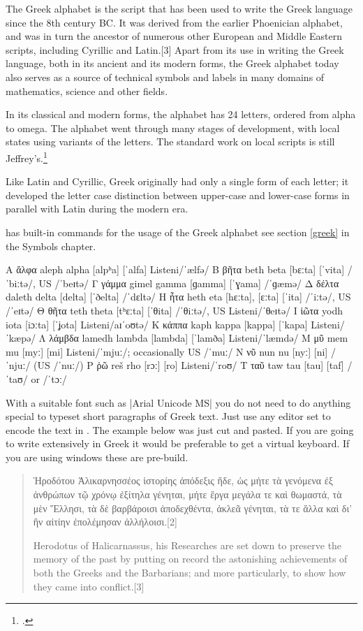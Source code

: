The Greek alphabet is the script that has been used to write the Greek language since the 8th century BC. It was derived from the earlier Phoenician alphabet, and was in turn the ancestor of numerous other European and Middle Eastern scripts, including Cyrillic and Latin.[3] Apart from its use in writing the Greek language, both in its ancient and its modern forms, the Greek alphabet today also serves as a source of technical symbols and labels in many domains of mathematics, science and other fields.

In its classical and modern forms, the alphabet has 24 letters, ordered from alpha to omega. The alphabet went through many stages of development, with local states using variants of the letters. The standard work on local scripts is still Jeffrey's.\footcite{jeffery1963}







Like Latin and Cyrillic, Greek originally had only a single form of each letter; it developed the letter case distinction between upper-case and lower-case forms in parallel with Latin during the modern era.

\tex has built-in commands for the usage of the Greek alphabet see section \ref{greek} in the Symbols chapter.

\bgroup
\obeylines
\greek\obeyspaces

Α	ἄλφα	aleph	alpha	[alpʰa]	[ˈalfa]	Listeni/ˈælfə/
Β	βῆτα	beth	beta	[bɛːta]	[ˈvita]	/ˈbiːtə/, US /ˈbeɪtə/
Γ	γάμμα	gimel	gamma	[ɡamma]	[ˈɣama]	/ˈɡæmə/
Δ	δέλτα	daleth	delta	[delta]	[ˈðelta]	/ˈdɛltə/
Η	ἦτα	  heth	   eta	 [hɛːta], [ɛːta]	[ˈita]	/ˈiːtə/, US /ˈeɪtə/
Θ	θῆτα	teth	theta	[tʰɛːta]	[ˈθita]	/ˈθiːtə/, US Listeni/ˈθeɪtə/
Ι	ἰῶτα	yodh	iota	[iɔːta]	[ˈʝota]	Listeni/aɪˈoʊtə/
Κ	κάππα	kaph	kappa	[kappa]	[ˈkapa]	Listeni/ˈkæpə/
Λ	λάμβδα	lamedh	lambda	[lambda]	[ˈlamða]	Listeni/ˈlæmdə/
Μ	μῦ	mem	mu	[myː]	[mi]	Listeni/ˈmjuː/; occasionally US /ˈmuː/
Ν	νῦ	nun	nu	[nyː]	[ni]	/ˈnjuː/ (US /ˈnuː/)
Ρ	ῥῶ	reš	rho	[rɔː]	[ro]	Listeni/ˈroʊ/
Τ	ταῦ	taw	tau	[tau]	[taf]	/ˈtaʊ/ or /ˈtɔː/
\egroup

With a suitable font such as |Arial Unicode MS| you do not need to do anything special to typeset short paragraphs of Greek text. Just use any editor set to encode the text in \utfviii. The example below was just cut and pasted. If you are going to write extensively in Greek it would be preferable to get a virtual keyboard. If you are using windows these are pre-build. 

\topline
\begin{quote}
Ἡροδότου Ἁλικαρνησσέος ἱστορίης ἀπόδεξις ἥδε, ὡς μήτε τὰ γενόμενα ἐξ ἀνθρώπων τῷ χρόνῳ ἐξίτηλα γένηται, μήτε ἔργα μεγάλα τε καὶ θωμαστά, τὰ μὲν Ἕλλησι, τὰ δὲ βαρβάροισι ἀποδεχθέντα, ἀκλεᾶ γένηται, τὰ τε ἄλλα καὶ δι' ἣν αἰτίην ἐπολέμησαν ἀλλήλοισι.[2]

Herodotus of Halicarnassus, his Researches are set down to preserve the memory of the past by putting on record the astonishing achievements of both the Greeks and the Barbarians; and more particularly, to show how they came into conflict.[3]
\end{quote}
\bottomline

